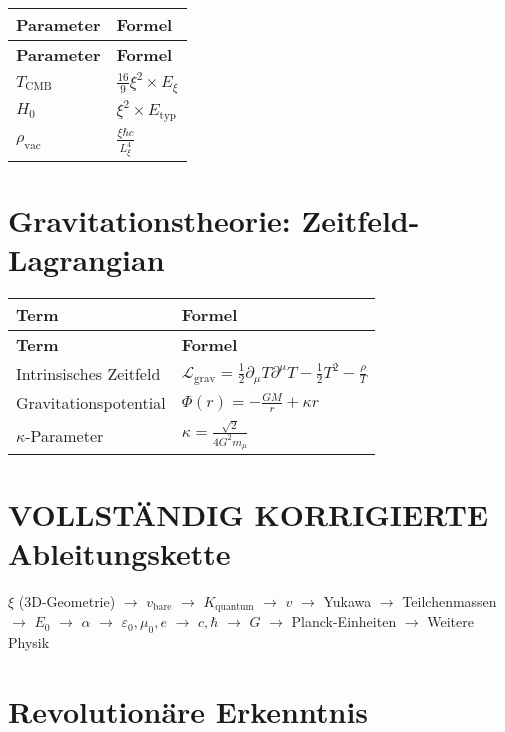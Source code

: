 \documentclass[12pt,a4paper]{article}
\begin{document}
	\begin{longtable}{|p{3cm}|p{4cm}|}
		\hline
		\textbf{Parameter} & \textbf{Formel} \\
		\hline
		\endfirsthead
		\hline
		\textbf{Parameter} & \textbf{Formel} \\
		\hline
		\endhead
		\(T_{\text{CMB}}\) & \(\frac{16}{9}\xi^{2} \times E_{\xi}\) \\
		\hline
		\(H_0\) & \(\xi^{2} \times E_{\text{typ}}\) \\
		\hline
		\(\rho_{\text{vac}}\) & \(\frac{\xi\hbar c}{L_{\xi}^{4}}\) \\
		\hline
	\end{longtable}
	
	\section{Gravitationstheorie: Zeitfeld-Lagrangian}
	
	\begin{longtable}{|p{4cm}|p{5cm}|}
		\hline
		\textbf{Term} & \textbf{Formel} \\
		\hline
		\endfirsthead
		\hline
		\textbf{Term} & \textbf{Formel} \\
		\hline
		\endhead
		Intrinsisches Zeitfeld & \(\mathcal{L}_{\text{grav}} = \frac{1}{2}\partial_{\mu}T\partial^{\mu}T - \frac{1}{2}T^{2} - \frac{\rho}{T}\) \\
		\hline
		Gravitationspotential & \(\Phi(r) = -\frac{GM}{r} + \kappa r\) \\
		\hline
		\(\kappa\)-Parameter & \(\kappa = \frac{\sqrt{2}}{4G^{2}m_{\mu}}\) \\
		\hline
	\end{longtable}
	
	\section{VOLLSTÄNDIG KORRIGIERTE Ableitungskette}
	
	\begin{center}
		\(\xi\) (3D-Geometrie) \(\rightarrow\) \(v_{\text{bare}}\) \(\rightarrow\) \(K_{\text{quantum}}\) \(\rightarrow\) \(v\) \(\rightarrow\) Yukawa \(\rightarrow\) Teilchenmassen \(\rightarrow\) \(E_0\) \(\rightarrow\) \(\alpha\) \(\rightarrow\) \(\varepsilon_0, \mu_0, e\) \(\rightarrow\) \(c, \hbar\) \(\rightarrow\) \(G\) \(\rightarrow\) Planck-Einheiten \(\rightarrow\) Weitere Physik
	\end{center}
	
	\section{Revolutionäre Erkenntnis}
	
\end{document}
